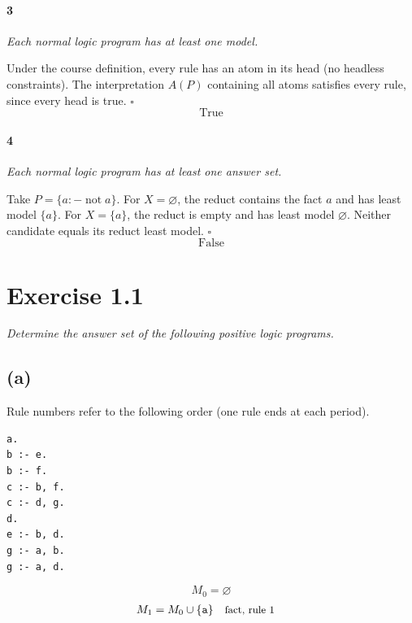 \documentclass[a4paper,11pt]{article}
\newif\ifexplain
\newcommand{\explain}[1]{\ifexplain\begin{erklbox}#1\end{erklbox}\fi}
\newcommand{\why}[1]{\text{\small #1}}
\newcommand{\angabe}[1]{\textit{#1}\par}
\newcommand{\aufgabe}[1]{\section*{Exercise #1}}
\newcommand{\teil}[1]{\subsection*{(#1)}}
\newcommand{\at}[1]{\texttt{#1}}
\begin{document}
\paragraph{3}\angabe{Each normal logic program has at least one model.}
Under the course definition, every rule has an atom in its head (no headless constraints). The interpretation $A(P)$ containing all atoms satisfies every rule, since every head is true. $\square$
\[
\boxed{\text{True}}
\]
\explain{Hier unterscheiden wir gewöhnliche Modelle von Answer Sets. Für ein Answer Set dürfen keine Atome ohne eine Herleitung aus dem Redukt übrig bleiben. Die Aussage über normale Programme nutzt ausdrücklich die Kursdefinition mit genau einem Atom im Regelkopf.}
\paragraph{4}\angabe{Each normal logic program has at least one answer set.}
Take $P=\{a\mathbin{:-}\mathop{not}a\}$. For $X=\varnothing$, the reduct contains the fact $a$ and has least model $\{a\}$. For $X=\{a\}$, the reduct is empty and has least model $\varnothing$. Neither candidate equals its reduct least model. $\square$
\[
\boxed{\text{False}}
\]
\explain{Hier unterscheiden wir gewöhnliche Modelle von Answer Sets. Für ein Answer Set dürfen keine Atome ohne eine Herleitung aus dem Redukt übrig bleiben. Die Aussage über normale Programme nutzt ausdrücklich die Kursdefinition mit genau einem Atom im Regelkopf.}
\aufgabe{1.1}
\angabe{Determine the answer set of the following positive logic programs.}
\teil{a}
Rule numbers refer to the following order (one rule ends at each period).
\begin{small}
\begin{verbatim}
a.
b :- e.
b :- f.
c :- b, f.
c :- d, g.
d.
e :- b, d.
g :- a, b.
g :- a, d.
\end{verbatim}
\end{small}
\explain{Die Fakten \texttt{a.} und \texttt{d.} starten die Ableitung. Die Regel \texttt{g :- a, d.} leitet $g$ ab; anschließend leitet \texttt{c :- d, g.} das Atom $c$ ab. $b$ und $e$ hängen nur voneinander ab und haben keinen Startfakt. Für $f$ gibt es überhaupt keine Regel mit diesem Kopf, daher wird $f$ nicht hergeleitet.}
\explain{Das Programm enthält keine Default-Negation. Wir beginnen bei der leeren Menge und wenden nur Regeln an, deren Körper bereits erfüllt ist. Fakten starten die Herleitung. Eine positive Schleife ohne diesen Start liefert dagegen keine Atome.}
\[
M_0=\varnothing
\]
\begin{align*}
M_{1} &= M_{0}\cup \{\at{a}\} && \why{fact, rule 1}
\end{align*}
\end{document}
